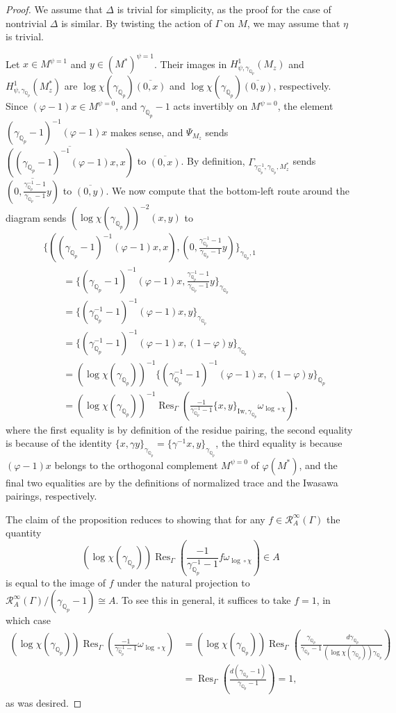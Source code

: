 \documentclass[12pt]{article}
\theoremstyle{definition}
\numberwithin{equation}{theorem}
\newcommand{\calR}{\mathcal{R}}
\newcommand{\QQ}{\mathbb{Q}}
\newcommand{\Iw}{\mathrm{Iw}}
\def\Qp{\QQ_p}
\DeclareMathOperator{\Res}{Res}
\begin{document}
\begin{proof}
We assume that $\Delta$ is trivial for simplicity, as the proof for
the case of nontrivial $\Delta$ is similar.  By twisting the action of
$\Gamma$ on $M$, we may assume that $\eta$ is trivial.

Let $x \in M^{\psi=1}$ and $y \in (M^*)^{\psi=1}$.  Their images in
$H^1_{\psi, \gamma_{\Qp}}(M_z)$ and $H^1_{\psi, \gamma_{\Qp}}(M^*_z)$
are $\log\chi(\gamma_{\Qp})\overline{(0, x)}$ and
$\log\chi(\gamma_{\Qp})\overline{(0, y)}$, respectively.  Since
$(\varphi-1)x \in M^{\psi=0}$, and $\gamma_{\Qp}-1$ acts invertibly on
$M^{\psi=0}$, the element $(\gamma_{\Qp}-1)^{-1}(\varphi-1)x$ makes
sense, and $\Psi_{M_z}$ sends
$\overline{((\gamma_{\Qp}-1)^{-1}(\varphi-1)x,x)}$ to
$\overline{(0,x)}$.  By definition,
$\Gamma_{\gamma_{\Qp}^{-1},\gamma_{\Qp},M_z^*}$ sends
$\overline{(0,\frac{\gamma_{\Qp}^{-1}-1}{\gamma_{\Qp}-1}y)}$ to
$\overline{(0,y)}$.  We now compute that the bottom-left route around
the diagram sends $(\log\chi(\gamma_{\Qp}))^{-2}(x,y)$ to
\begin{align*}
&\{
((\gamma_{\Qp}-1)^{-1}(\varphi-1)x,x),
(0,\frac{\gamma_{\Qp}^{-1}-1}{\gamma_{\Qp}-1}y)
\}_{\gamma_{\Qp},1} \\
&\qquad=
\{
(\gamma_{\Qp}-1)^{-1}(\varphi-1)x,
\frac{\gamma_{\Qp}^{-1}-1}{\gamma_{\Qp}-1}y
\}_{\gamma_{\Qp}} \\
&\qquad=
\{
(\gamma_{\Qp}^{-1}-1)^{-1}(\varphi-1)x,
y
\}_{\gamma_{\Qp}} \\
&\qquad=
\{
(\gamma_{\Qp}^{-1}-1)^{-1}(\varphi-1)x,
(1-\varphi)y
\}_{\gamma_{\Qp}} \\
&\qquad=
(\log\chi(\gamma_{\Qp}))^{-1}\{
(\gamma_{\Qp}^{-1}-1)^{-1}(\varphi-1)x,
(1-\varphi)y
\}_{\Qp} \\
&\qquad=
(\log\chi(\gamma_{\Qp}))^{-1}\Res_\Gamma(\frac{-1}{\gamma_{\Qp}^{-1}-1}\{x,y\}_{\Iw,\gamma_{\Qp}}\omega_{\log\circ\chi}),
\end{align*}
where the first equality is by definition of the residue pairing, the
second equality is because of the identity $\{x,\gamma
y\}_{\gamma_{\Qp}} = \{\gamma^{-1}x,y\}_{\gamma_{\Qp}}$, the third
equality is because $(\varphi-1)x$ belongs to the orthogonal
complement $M^{\psi=0}$ of $\varphi(M^*)$, and the final two
equalities are by the definitions of normalized trace and the Iwasawa
pairings, respectively.

The claim of the proposition reduces to showing that for any $f \in
\calR_A^\infty(\Gamma)$ the quantity
\[
(\log\chi(\gamma_{\Qp}))
\Res_\Gamma(\frac{-1}{\gamma_{\Qp}^{-1}-1}f\omega_{\log\circ\chi}) \in A
\]
is equal to the image of $f$ under the natural projection to
$\calR_A^\infty(\Gamma)/(\gamma_{\Qp}-1) \cong A$.  To see this in
general, it suffices to take $f=1$, in which case
\begin{align*}
(\log\chi(\gamma_{\Qp}))
\Res_\Gamma(\frac{-1}{\gamma_{\Qp}^{-1}-1}\omega_{\log\circ\chi})
&=
(\log\chi(\gamma_{\Qp}))
\Res_\Gamma(\frac{\gamma_{\Qp}}{\gamma_{\Qp}-1}\frac{d\gamma_{\Qp}}{(\log\chi(\gamma_{\Qp}))\gamma_{\Qp}}) \\
&=
\Res_\Gamma(\frac{d(\gamma_{\Qp}-1)}{\gamma_{\Qp}-1})
=
1,
\end{align*}
as was desired.
\end{proof}
\end{document}
